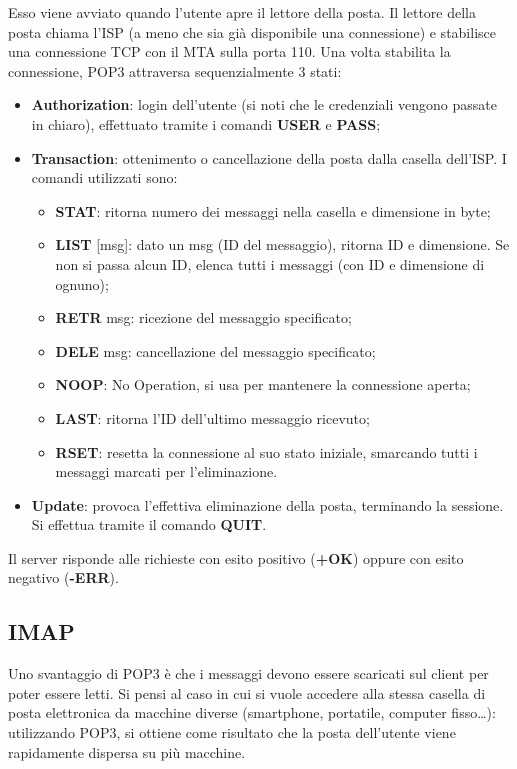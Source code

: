     Esso viene avviato quando l’utente apre il lettore della posta. Il lettore della posta chiama l’ISP
    (a meno che sia già disponibile una connessione) e stabilisce una connessione TCP con il MTA
    sulla porta 110. Una volta stabilita la connessione, POP3 attraversa sequenzialmente 3 stati:\\
    \begin{itemize}
        \item \textbf{Authorization}: login dell’utente (si noti che le credenziali vengono passate in chiaro),
        effettuato tramite i comandi \textbf{USER} e \textbf{PASS};
        \item \textbf{Transaction}: ottenimento o cancellazione della posta dalla casella dell’ISP. I comandi
        utilizzati sono:
        \begin{itemize}
            \item \textbf{STAT}: ritorna numero dei messaggi nella casella e dimensione in byte;
            \item \textbf{LIST} [msg]: dato un msg (ID del messaggio), ritorna ID e dimensione. Se non si
            passa alcun ID, elenca tutti i messaggi (con ID e dimensione di ognuno);
            \item \textbf{RETR} msg: ricezione del messaggio specificato;
            \item \textbf{DELE} msg: cancellazione del messaggio specificato;
            \item \textbf{NOOP}: No Operation, si usa per mantenere la connessione aperta;
            \item \textbf{LAST}: ritorna l’ID dell’ultimo messaggio ricevuto;
            \item \textbf{RSET}: resetta la connessione al suo stato iniziale, smarcando tutti i messaggi
            marcati per l’eliminazione.
        \end{itemize}
        \item \textbf{Update}: provoca l’effettiva eliminazione della posta, terminando la sessione. Si effettua
        tramite il comando \textbf{QUIT}.
    \end{itemize}
    
    Il server risponde alle richieste con esito positivo (\textbf{+OK}) oppure con esito negativo (\textbf{-ERR}).

    \subsection{IMAP}
    Uno svantaggio di POP3 è che i messaggi devono essere scaricati sul client per poter essere letti.
    Si pensi al caso in cui si vuole accedere alla stessa casella di posta elettronica da macchine
    diverse (smartphone, portatile, computer fisso…): utilizzando POP3, si ottiene come risultato
    che la posta dell’utente viene rapidamente dispersa su più macchine.\\

